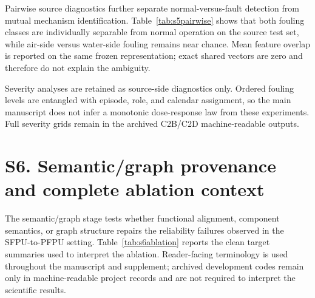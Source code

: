 \documentclass[preprint,12pt]{elsarticle}
\begin{document}
\begin{table}[H]
\centering
\caption{Model-family evidence underlying the IGTI class interpretation.}
\label{tab:s5evidence}
\resizebox{\textwidth}{!}{}
\end{table}

Pairwise source diagnostics further separate normal-versus-fault detection from mutual mechanism identification. Table~\ref{tab:s5pairwise} shows that both fouling classes are individually separable from normal operation on the source test set, while air-side versus water-side fouling remains near chance. Mean feature overlap is reported on the same frozen representation; exact shared vectors are zero and therefore do not explain the ambiguity.

\begin{table}[H]
\centering
\caption{Selected source-test pairwise separability diagnostics. No target pairwise fitting or evaluation is used.}
\label{tab:s5pairwise}
\resizebox{\textwidth}{!}{}
\end{table}

Severity analyses are retained as source-side diagnostics only. Ordered fouling levels are entangled with episode, role, and calendar assignment, so the main manuscript does not infer a monotonic dose-response law from these experiments. Full severity grids remain in the archived C2B/C2D machine-readable outputs.

\section{S6. Semantic/graph provenance and complete ablation context}
The semantic/graph stage tests whether functional alignment, component semantics, or graph structure repairs the reliability failures observed in the SFPU-to-PFPU setting. Table~\ref{tab:s6ablation} reports the clean target summaries used to interpret the ablation. Reader-facing terminology is used throughout the manuscript and supplement; archived development codes remain only in machine-readable project records and are not required to interpret the scientific results.

\begin{table}[H]
\centering
\caption{Target clean-condition ablation summary. Graph rows use the graph-convolutional model family; raw/functional/semantic rows retain the source model family shown.}
\label{tab:s6ablation}
\resizebox{\textwidth}{!}{}
\end{table}
\end{document}
